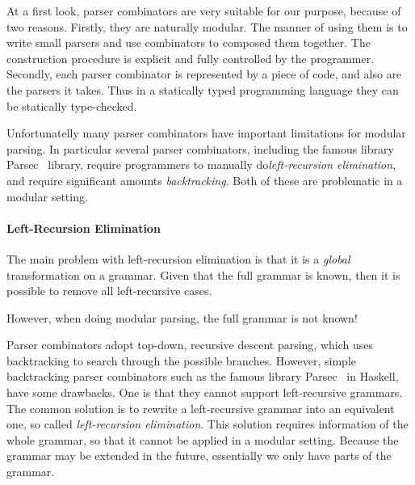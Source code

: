 At a first look, parser combinators are very suitable for our purpose, because of two
reasons. Firstly, they are naturally modular. The manner of using them
is to write small parsers and use combinators to composed them
together. The construction procedure is explicit and fully controlled
by the programmer. Secondly, each parser combinator is represented by
a piece of code, and also are the parsers it takes. Thus in a
statically typed programming language they can be statically
type-checked.

Unfortunatelly many parser combinators have important limitations for
modular parsing. In particular several parser combinators, 
including the famous library Parsec~\cite{} library, require
programmers to manually do\textit{left-recursion elimination}, and
require significant amounts \textit{backtracking}. Both of these are
problematic in a modular setting.

\paragraph{Left-Recursion Elimination} The main problem with
left-recursion elimination is that it is a \emph{global}
transformation on a grammar. Given that the full grammar is known,
then it is possible to remove all left-recursive cases.

However, when doing modular parsing, the full grammar is not known!


Parser combinators adopt top-down, recursive descent parsing, which
uses backtracking to search through the possible branches. However,
simple backtracking parser combinators such as the famous library
Parsec~\cite{} in Haskell, have some drawbacks. One is that they cannot
support left-recursive grammars. The common solution is to rewrite a
left-recursive grammar into an equivalent one, so called
\textit{left-recursion elimination}. This solution requires
information of the whole grammar, so that it cannot be applied in a
modular setting. Because the grammar may be extended in the future,
essentially we only have parts of the grammar. 

